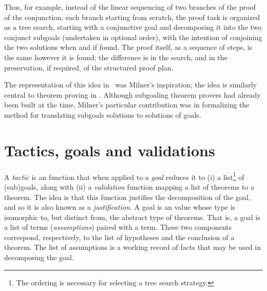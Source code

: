 Thus, for example, instead of
the linear sequencing of two branches of the proof of the conjunction,
each branch starting from scratch, the proof task is organized
as a tree search, starting with a conjunctive goal
and decomposing it into the two conjunct subgoals (undertaken in optional
order), with the intention of conjoining the two solutions when and if found.
The proof itself, as a sequence of steps, is the same however it is found;
the difference is in the search, and in the preservation, if required, of
the structured proof plan.

The representation of this idea in \LCF\ was Milner's inspiration;
the idea is similarly central to theorem proving in \HOL.
Although subgoaling theorem provers had already been built at the time,
Milner's particular contribution was in formalizing the method for
translating subgoals solutions to solutions of goals.




\section{Tactics, goals and validations}
\label{tactics}

A \emph{tactic} is an \ML{} function that when applied to a \emph{goal} reduces it to
(i) a list\footnote{The ordering is necessary for selecting a tree search strategy.} of (sub)goals, along with
(ii) a \emph{validation} function mapping a list of theorems to a theorem.
The idea is that this function justifies the decomposition of the goal, and so it is also known as a \emph{justification}.
A goal is an \ML{} value whose type is isomorphic to, but distinct from, the \ML{} abstract type  of theorems.
That is, a goal is a list of terms (\emph{assumptions}) paired with a term.
These two components correspond, respectively, to the list of hypotheses
and the conclusion of a theorem.
The list of assumptions is a working record of facts that may be used in decomposing the goal.

